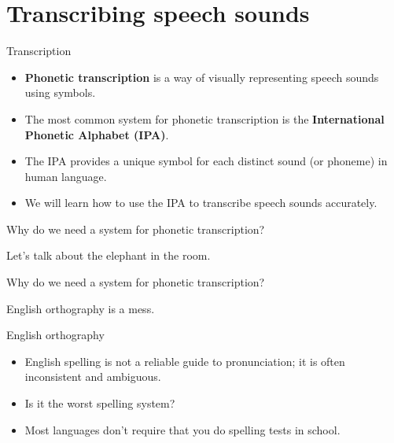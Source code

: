 \documentclass[professionalfonts]{beamer}
\begin{document}
\section{Transcribing speech sounds}

\begin{frame}{Transcription}
    \begin{itemize}
        \item \textbf{Phonetic transcription} is a way of visually representing speech sounds using symbols.
        \item The most common system for phonetic transcription is the \textbf{International Phonetic Alphabet (IPA)}.
        \item The IPA provides a unique symbol for each distinct sound (or phoneme) in human language.
        \item We will learn how to use the IPA to transcribe speech sounds accurately.
    \end{itemize}
\end{frame}

\begin{frame}{Why do we need a system for phonetic transcription?}
    \begin{center}
        \huge Let's talk about the elephant in the room.
    \end{center}
\end{frame}

\begin{frame}{Why do we need a system for phonetic transcription?}
    \begin{center}
        \huge English orthography is a mess. 
    \end{center}
\end{frame}

\begin{frame}{English orthography}
    \begin{itemize}
        \item English spelling is not a reliable guide to pronunciation; it is often inconsistent and ambiguous.
        \item Is it the worst spelling system? 
        \item Most languages don't require that you do spelling tests in school.
    \end{itemize}
\end{frame}
\end{document}
